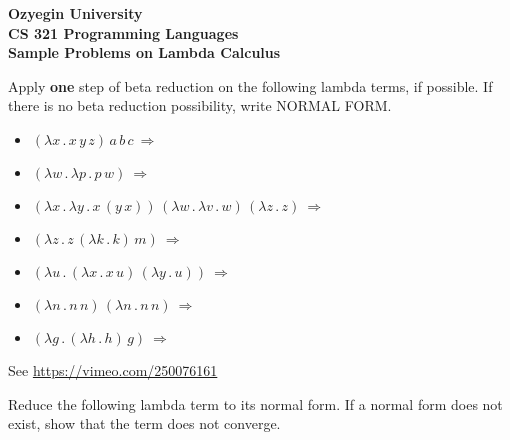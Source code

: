 \documentclass[addpoints]{exam}
\begin{document}
\begin{center}
{\Large \textbf{
    Ozyegin University\\
    CS 321 Programming Languages\\
    Sample Problems on Lambda Calculus
}}
\end{center}

\begin{questions}
  \question
  Apply \textbf{one} step of beta reduction on the following lambda terms,
  if possible. If there is no beta reduction possibility, write NORMAL FORM.

  \begin{itemize}
  \item $(\lambda x\,.\,x\,y\,z)\,a\,b\,c~\Rightarrow~$\fillin[ $(a\,y\,z)\,b\,c$ ][4cm]\\[1em]
  \item $(\lambda w\,.\,\lambda p\,.\,p\,w)~\Rightarrow~$\\[1em]
  \item $(\lambda x\,.\,\lambda y\,.\,x\,(y\,x))\,(\lambda w\,.\,\lambda v\,.\,w)\,(\lambda z\,.\,z)~\Rightarrow~$\\[1em]
  \item $(\lambda z\,.\,z\,(\lambda k\,.\,k)\,m)~\Rightarrow~$\\[1em]
  \item $(\lambda u\,.\,(\lambda x\,.\,x\,u)\,(\lambda y\,.\,u))~\Rightarrow~$\\[1em]
  \item $(\lambda n\,.\,n\,n)\,(\lambda n\,.\,n\,n)~\Rightarrow~$\\[1em]
  \item $(\lambda g\,.\,(\lambda h\,.\,h)\,g)~\Rightarrow~$\fillin[ $(\lambda g\,.\,g)$ ][4cm]\\[1em]
  \end{itemize}
  \begin{solution}
    See \url{https://vimeo.com/250076161}
  \end{solution}
  

  \question
  Reduce the following lambda term to its normal form. If a normal form
  does not exist, show that the term does not converge.


\end{questions}
\end{document}
